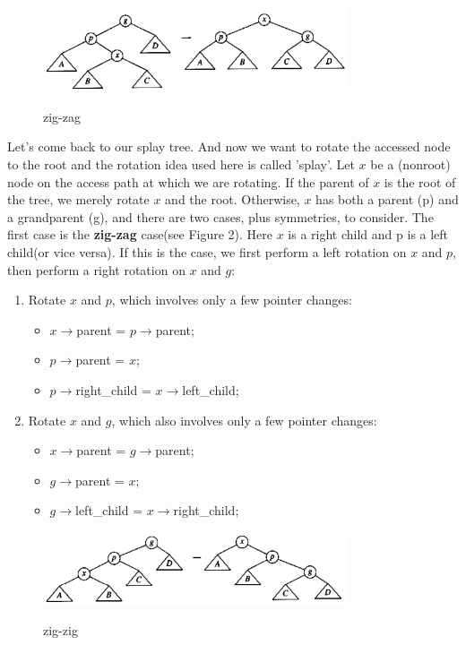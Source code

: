 \documentclass[a4paper,11pt]{article}
\begin{document}
\begin{figure}
  \centering
  \includegraphics[width=0.8\textwidth]{zig_zag}\\
  \caption{zig-zag}%
\end{figure}

Let's come back to our splay tree. And now we want to rotate the accessed node to the root and the rotation idea used here is called 'splay'. Let $x$ be a (nonroot) node on the access path at which we are rotating. If the parent of $x$ is the root of the tree, we merely rotate $x$ and the root. Otherwise, $x$ has both a parent (p) and a grandparent (g), and there are two cases, plus symmetries, to consider. The first case is the \textbf{zig-zag} case(see Figure 2). Here $x$ is a right child and p is a left child(or vice versa). If this is the case, we first perform a left rotation on $x$ and $p$, then perform a right rotation on $x$ and $g$:
\begin{enumerate}
  \item
    Rotate $x$ and $p$, which involves only a few pointer changes:
    \begin{itemize}
       \item $x$$\rightarrow$parent = $p$$\rightarrow$parent;
       \item $p$$\rightarrow$parent = $x$;
       \item $p$$\rightarrow$right\_child = $x$$\rightarrow$left\_child;
    \end{itemize}
    \item
    Rotate $x$ and $g$, which also involves only a few pointer changes:
    \begin{itemize}
      \item $x$$\rightarrow$parent = $g$$\rightarrow$parent;
      \item $g$$\rightarrow$parent = $x$;
      \item $g$$\rightarrow$left\_child = $x$$\rightarrow$right\_child;
    \end{itemize}
\end{enumerate}
\begin{figure}
  \centering
  \includegraphics[width=0.8\textwidth]{zig_zig}\\
  \caption{zig-zig}%
\end{figure}
\end{document}
